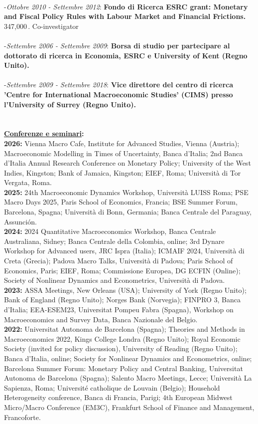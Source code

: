 \documentclass[10p]{article}
\begin{document}
\\
-\emph{Ottobre 2010 - Settembre 2012}: {\bf Fondo di Ricerca ESRC grant: Monetary and Fiscal Policy Rules with Labour Market and Financial Frictions.} 347,000\textsterling$\,$. Co-investigator\\
\\
-\emph{Settembre 2006 - Settembre 2009}: {\bf Borsa di studio per partecipare al dottorato di ricerca in Economia, ESRC e  University of Kent (Regno Unito).}\\
\\
-\emph{Settembre 2009 - Settembre 2018}: {\bf Vice direttore del centro di ricerca 'Centre for International Macroeconomic Studies' (CIMS) presso l'University of Surrey (Regno Unito).}\\
\\
\\
{\bf \underline{Conferenze e seminari}:}\\
\textbf{2026:} {Vienna Macro Cafe, Institute for Advanced Studies, Vienna (Austria); Macroeconomic Modelling in Times of Uncertainty, Banca d'Italia; 2nd Banca d'Italia Annual Research Conference
on Monetary Policy; University of the West Indies, Kingston; Bank of Jamaica, Kingston; EIEF, Roma; Università di Tor Vergata, Roma.}
\\
\textbf{2025:} {24th Macroeconomic Dynamics Workshop, Università LUISS Roma; PSE Macro Days 2025, Paris School of Economics, Francia; BSE Summer Forum, Barcelona, Spagna; Università di Bonn, Germania; Banca Centrale del Paraguay, Assunción.}
\\
\textbf{2024:} {2024 Quantitative Macroeconomics Workshop, Banca Centrale Australiana, Sidney; Banca Centrale della Colombia, online; 3rd Dynare Workshop for Advanced users, JRC Ispra (Italia); ICMAIF 2024, Universit\`{a} di Creta (Grecia); Padova Macro Talks, Universit\`{a} di Padova; Paris School of Economics, Paris; EIEF, Roma; Commissione Europea, DG ECFIN (Online); Society of Nonlinear Dynamics and Econometrics, Universit\`{a} di Padova.}
\\
\textbf{2023:} {ASSA Meetings, New Orleans (USA); University of York (Regno Unito); Bank of England (Regno Unito); Norges Bank (Norvegia); FINPRO 3, Banca d'Italia; EEA-ESEM23, Universitat Pompeu Fabra (Spagna), Workshop on Macroeconomics and Survey Data, Banca Nazionale del Belgio.}
\\
\textbf{2022:} {Universitat Autonoma de Barcelona (Spagna); Theories and Methods in Macroeconomics 2022, Kings College Londra (Regno Unito); Royal Economic Society (invited for policy discussion), University of Reading (Regno Unito); Banca d'Italia, online; Society for Nonlinear Dynamics and Econometrics, online; Barcelona Summer Forum: Monetary Policy and Central Banking, Universitat Autonoma de Barcelona (Spagna); Salento Macro Meetings, Lecce; Universit\`{a} La Sapienza, Roma; Universit\'{e} catholique de Louvain (Belgio); Household Heterogeneity conference, Banca di Francia, Parigi; 4th European Midwest Micro/Macro Conference (EM3C), Frankfurt School of Finance and Management, Francoforte.}
\end{document}
